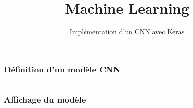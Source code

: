 \documentclass{formation}
\title{Machine Learning}
\subtitle{Implémentation d'un CNN avec Keras}
\begin{document}
\maketitle

\begin{frame}
  \frametitle{Définition d'un modèle CNN}
  \inputminted[linenos,fontsize=\small,bgcolor=pythonbg]{python}{code-illustration/tf-keras-cnn.py}
\end{frame}

\begin{frame}
  \frametitle{Affichage du modèle}
  \inputminted[linenos,fontsize=\small,bgcolor=pythonbg]{python}{code-illustration/tf-keras-print-model.py}
  \inputminted[linenos,fontsize=\small,bgcolor=returnbg]{python}{code-illustration/tf-keras-print-cnn-model.txt}
\end{frame}
\end{document}
